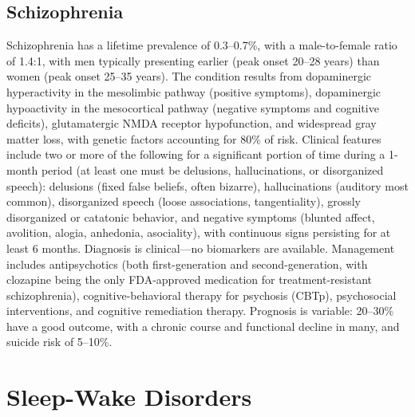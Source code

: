 \subsection{Schizophrenia}
\label{sec:Schizophrenia}
Schizophrenia has a lifetime prevalence of 0.3--0.7\%, with a male-to-female ratio of 1.4:1, with men typically presenting earlier (peak onset 20--28 years) than women (peak onset 25--35 years). The condition results from dopaminergic hyperactivity in the mesolimbic pathway (positive symptoms), dopaminergic hypoactivity in the mesocortical pathway (negative symptoms and cognitive deficits), glutamatergic NMDA receptor hypofunction, and widespread gray matter loss, with genetic factors accounting for 80\% of risk. Clinical features include two or more of the following for a significant portion of time during a 1-month period (at least one must be delusions, hallucinations, or disorganized speech): delusions (fixed false beliefs, often bizarre), hallucinations (auditory most common), disorganized speech (loose associations, tangentiality), grossly disorganized or catatonic behavior, and negative symptoms (blunted affect, avolition, alogia, anhedonia, asociality), with continuous signs persisting for at least 6 months. Diagnosis is clinical---no biomarkers are available. Management includes antipsychotics (both first-generation and second-generation, with clozapine being the only FDA-approved medication for treatment-resistant schizophrenia), cognitive-behavioral therapy for psychosis (CBTp), psychosocial interventions, and cognitive remediation therapy. Prognosis is variable: 20--30\% have a good outcome, with a chronic course and functional decline in many, and suicide risk of 5--10\%.

\section{Sleep-Wake Disorders}






